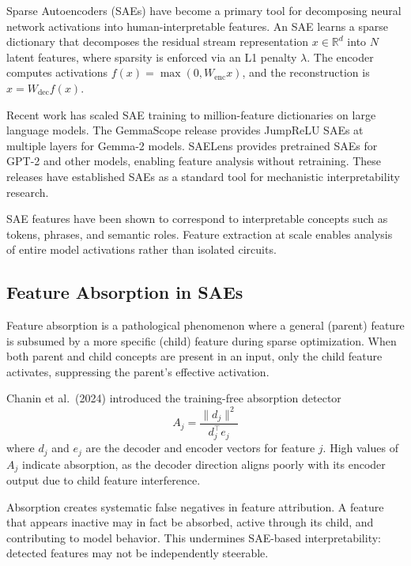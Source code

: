 \documentclass{article}
\begin{document}
Sparse Autoencoders (SAEs) have become a primary tool for decomposing neural network activations into human-interpretable features. An SAE learns a sparse dictionary that decomposes the residual stream representation $x \in \mathbb{R}^d$ into $N$ latent features, where sparsity is enforced via an L1 penalty $\lambda$. The encoder computes activations $f(x) = \max(0, W_{\text{enc}} x)$, and the reconstruction is $\hat{x} = W_{\text{dec}} f(x)$.

Recent work has scaled SAE training to million-feature dictionaries on large language models. The GemmaScope release \citep{lieberum2024gemmascope} provides JumpReLU SAEs at multiple layers for Gemma-2 models. SAELens \citep{bloom2024saelens} provides pretrained SAEs for GPT-2 and other models, enabling feature analysis without retraining. These releases have established SAEs as a standard tool for mechanistic interpretability research.

SAE features have been shown to correspond to interpretable concepts such as tokens, phrases, and semantic roles. Feature extraction at scale enables analysis of entire model activations rather than isolated circuits.

\subsection{Feature Absorption in SAEs}

Feature absorption is a pathological phenomenon where a general (parent) feature is subsumed by a more specific (child) feature during sparse optimization. When both parent and child concepts are present in an input, only the child feature activates, suppressing the parent's effective activation.

Chanin et al.\ (2024) introduced the training-free absorption detector
\begin{equation}
A_j = \frac{\|d_j\|^2}{d_j^\top e_j}
\end{equation}
where $d_j$ and $e_j$ are the decoder and encoder vectors for feature $j$. High values of $A_j$ indicate absorption, as the decoder direction aligns poorly with its encoder output due to child feature interference.

Absorption creates systematic false negatives in feature attribution. A feature that appears inactive may in fact be absorbed, active through its child, and contributing to model behavior. This undermines SAE-based interpretability: detected features may not be independently steerable.
\end{document}
